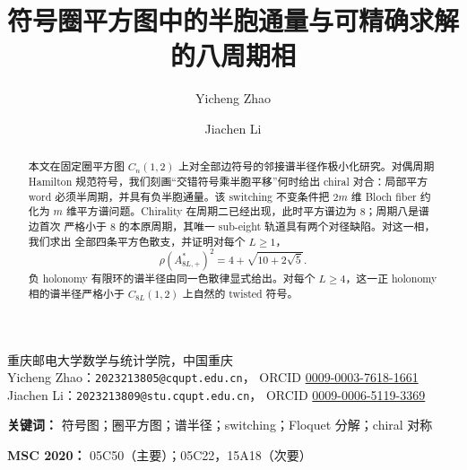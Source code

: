 \title{符号圈平方图中的半胞通量与可精确求解的八周期相}
\author{Yicheng Zhao \and Jiachen Li}
\date{}
\maketitle

\begin{center}
\small
重庆邮电大学数学与统计学院，中国重庆\\[2pt]
Yicheng Zhao：\texttt{2023213805@cqupt.edu.cn}，
ORCID \href{https://orcid.org/0009-0003-7618-1661}{0009-0003-7618-1661}\\
Jiachen Li：\texttt{2023213809@stu.cqupt.edu.cn}，
ORCID \href{https://orcid.org/0009-0006-5119-3369}{0009-0006-5119-3369}
\end{center}

\begin{abstract}
本文在固定圈平方图 $C_n(1,2)$ 上对全部边符号的邻接谱半径作极小化研究。对偶周期
Hamilton 规范符号，我们刻画“交错符号乘半胞平移”何时给出 chiral 对合：局部平方 word
必须半周期，并具有负半胞通量。该 switching 不变条件把 $2m$ 维 Bloch fiber 约化为
$m$ 维平方谱问题。Chirality 在周期二已经出现，此时平方谱边为 $8$；周期八是谱边首次
严格小于 $8$ 的本原周期，其唯一 sub-eight 轨道具有两个对径缺陷。对这一相，我们求出
全部四条平方色散支，并证明对每个
$L\geq1$，
\[
 \rho(A_{8L,+}^{*})^2=4+\sqrt{10+2\sqrt5}.
\]
负 holonomy 有限环的谱半径由同一色散律显式给出。对每个 $L\geq4$，这一正 holonomy
相的谱半径严格小于 $C_{8L}(1,2)$ 上自然的 twisted 符号。
\end{abstract}

\noindent\textbf{关键词：} 符号图；圈平方图；谱半径；switching；Floquet 分解；chiral 对称

\medskip
\noindent\textbf{MSC 2020：} 05C50（主要）；05C22，15A18（次要）
